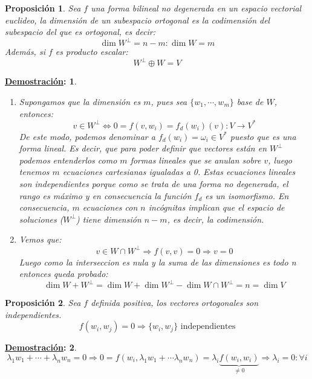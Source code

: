 \documentclass[10pt,a4paper,openright]{book}
\theoremstyle{break}
\newtheorem*{prop}{Proposición}
\newtheorem*{demo}{\underline{Demostración}:}
\begin{document}
\begin{prop}
Sea $f$ una forma bilineal no degenerada en un espacio vectorial euclideo, la dimensión de un subespacio ortogonal es la codimensión del subespacio del que es ortogonal, es decir:
$$\dim W^\perp = n-m: \dim W = m$$
Además, si $f$ es producto escalar:
$$W^\perp \oplus W = V$$
\end{prop}
\begin{demo}
\begin{enumerate}
\item Supongamos que la dimensión es $m$, pues sea $\{w_1, \cdots, w_m\}$ base de $W$, entonces:
$$v\in W^\perp\Leftrightarrow 0 = f(v,w_i) = f_d(w_i)(v): V\rightarrow V^*$$
De este modo, podemos denominar a $f_d(w_i)=\omega_i\in V^*$ puesto que es una forma lineal. Es decir, que para poder definir que vectores están en $W^\perp$ podemos entenderlos como $m$ formas lineales que se anulan sobre $v$, luego tenemos $m$ ecuaciones cartesianas igualadas a 0. Estas ecuaciones lineales son independientes porque como se trata de una forma no degenerada, el rango es máximo y en consecuencia la función $f_d$ es un isomorfismo. En consecuencia, $m$ ecuaciones con $n$ incógnitas implican que el espacio de soluciones ($W^\perp$) tiene dimensión $n-m$, es decir, la codimensión.

\item Vemos que:
$$v\in W\cap W^\perp \Rightarrow f(v,v)=0\Rightarrow v = 0$$
Luego como la interseccion es nula y la suma de las dimensiones es todo n entonces queda probado:
$$\dim W+W^\perp = \dim W + \dim W^\perp -\dim W\cap W^\perp = n = \dim V$$
\end{enumerate}
\end{demo}

\begin{prop}
Sea $f$ definida positiva, los vectores ortogonales son independientes.
$$f(w_i,w_j) = 0\Rightarrow \{w_i, w_j\} \mbox{ independientes}$$
\end{prop}
\begin{demo}
$$\lambda_1w_1+\cdots+\lambda_nw_n = 0 \Rightarrow 0 = f(w_i, \lambda_1w_1+\cdots \lambda_nw_n) = \lambda_i\underbrace{f(w_i,w_i)}_{\neq 0}\Rightarrow\lambda_i = 0: \forall i$$
\end{demo}
\end{document}

